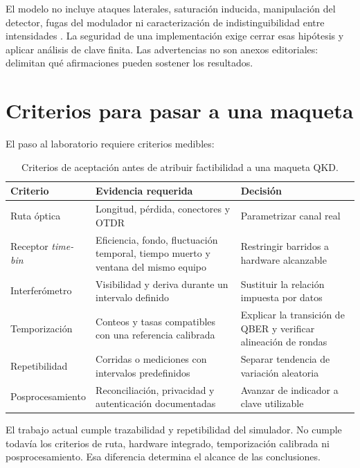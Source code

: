 El modelo no incluye ataques laterales, saturación inducida, manipulación del detector, fugas del modulador ni caracterización de indistinguibilidad entre intensidades \cite{scarani2009security}. La seguridad de una implementación exige cerrar esas hipótesis y aplicar análisis de clave finita. Las advertencias no son anexos editoriales: delimitan qué afirmaciones pueden sostener los resultados.

\clearpage
\section{Criterios para pasar a una maqueta}

El paso al laboratorio requiere criterios medibles:

\begin{table}[H]
  \centering
  \begin{tabularx}{\textwidth}{p{}p{}X}
    \toprule
    Criterio & Evidencia requerida & Decisión \\
    \midrule
    Ruta óptica & Longitud, pérdida, conectores y OTDR & Parametrizar canal real \\
    Receptor \textit{time-bin} & Eficiencia, fondo, fluctuación temporal, tiempo muerto y ventana del mismo equipo & Restringir barridos a hardware alcanzable \\
    Interferómetro & Visibilidad y deriva durante un intervalo definido & Sustituir la relación impuesta por datos \\
    Temporización & Conteos y tasas compatibles con una referencia calibrada & Explicar la transición de QBER y verificar alineación de rondas \\
    Repetibilidad & Corridas o mediciones con intervalos predefinidos & Separar tendencia de variación aleatoria \\
    Posprocesamiento & Reconciliación, privacidad y autenticación documentadas & Avanzar de indicador a clave utilizable \\
    \bottomrule
  \end{tabularx}
  \caption{Criterios de aceptación antes de atribuir factibilidad a una maqueta QKD.}
  \label{tab:criterios_aceptacion}
\end{table}

El trabajo actual cumple trazabilidad y repetibilidad del simulador. No cumple todavía los criterios de ruta, hardware integrado, temporización calibrada ni posprocesamiento. Esa diferencia determina el alcance de las conclusiones.
